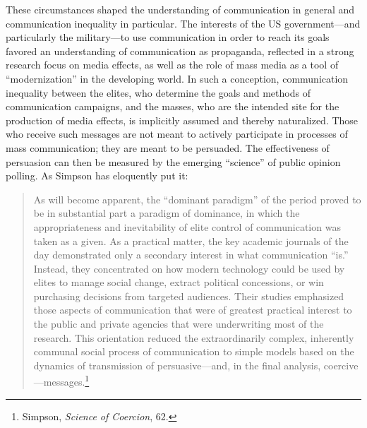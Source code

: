 \documentclass{tufte-handout}
\begin{document}
These circumstances shaped the understanding of communication in general
and communication inequality in particular. The interests of the US
government---and particularly the military---to use communication in
order to reach its goals favored an understanding of communication as
propaganda, reflected in a strong research focus on media effects, as
well as the role of mass media as a tool of ``modernization'' in the
developing world. In such a conception, communication inequality between
the elites, who determine the goals and methods of communication
campaigns, and the masses, who are the intended site for the production
of media effects, is implicitly assumed and thereby naturalized. Those
who receive such messages are not meant to actively participate in
processes of mass communication; they are meant to be persuaded. The
effectiveness of persuasion can then be measured by the emerging
``science'' of public opinion polling. As Simpson has eloquently put it:

\begin{quote}
As will become apparent, the ``dominant paradigm'' of the period proved
to be in substantial part a paradigm of dominance, in which the
appropriateness and inevitability of elite control of communication was
taken as a given. As a practical matter, the key academic journals of
the day demonstrated only a secondary interest in what communication
``is.'' Instead, they concentrated on how modern technology could be
used by elites to manage social change, extract political concessions,
or win purchasing decisions from targeted audiences. Their studies
emphasized those aspects of communication that were of greatest
practical interest to the public and private agencies that were
underwriting most of the research. This orientation reduced the
extraordinarily complex, inherently communal social process of
communication to simple models based on the dynamics of transmission of
persuasive---and, in the final analysis, coercive---messages.\footnote{Simpson,
  \emph{Science of Coercion}, 62.}
\end{quote}
\end{document}
